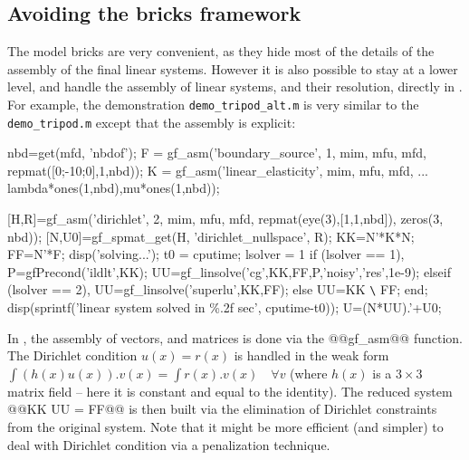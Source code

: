 \subsection{Avoiding the bricks framework}

The model bricks are very convenient, as they hide most of the details
of the assembly of the final linear systems. However it is also
possible to stay at a lower level, and handle the assembly of linear
systems, and their resolution, directly in \mlab. For example, the
demonstration \texttt{demo\_tripod\_alt.m} is very similar to the
\texttt{demo\_tripod.m} except that the assembly is explicit:

\begin{mcode}
nbd=get(mfd, 'nbdof');
F = gf_asm('boundary_source', 1, mim, mfu, mfd, repmat([0;-10;0],1,nbd));
K = gf_asm('linear_elasticity', mim, mfu, mfd, ...
	   lambda*ones(1,nbd),mu*ones(1,nbd));

[H,R]=gf_asm('dirichlet', 2, mim, mfu, mfd, repmat(eye(3),[1,1,nbd]), zeros(3, nbd));
[N,U0]=gf_spmat_get(H, 'dirichlet_nullspace', R);
KK=N'*K*N;
FF=N'*F;
disp('solving...'); t0 = cputime;
lsolver = 1 %
if (lsolver == 1),     %
  P=gfPrecond('ildlt',KK);
  UU=gf_linsolve('cg',KK,FF,P,'noisy','res',1e-9);
elseif (lsolver == 2), %
  UU=gf_linsolve('superlu',KK,FF);
else                   %
  UU=KK \verb+\+ FF;
end;
disp(sprintf('linear system solved in \%.2f sec', cputime-t0));
U=(N*UU).'+U0;
\end{mcode}

In \gfi, the assembly of vectors, and matrices is done via the
@@gf\_asm@@ function. The Dirichlet condition $u(x) = r(x)$ is handled
in the weak form $\int (h(x)u(x)).v(x) = \int r(x).v(x)\quad \forall v$ (where
$h(x)$ is a $3\times3$ matrix field -- here it is constant and equal to the
identity). The reduced system @@KK UU = FF@@ is then built via the
elimination of Dirichlet constraints from the original system. Note
that it might be more efficient (and simpler) to deal with Dirichlet
condition via a penalization technique.


